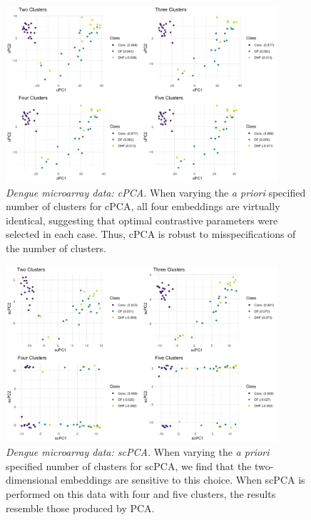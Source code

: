 \documentclass{article}
\begin{document}
\begin{figure}[!htbp]
    \centering
    \includegraphics[width=0.9\textwidth]{figures/dengue_cpca_centers}
    \caption{
    {\em Dengue microarray data: cPCA.}
    When varying the \textit{a priori} specified number of clusters for cPCA, all four embeddings are virtually identical, suggesting that optimal contrastive parameters were selected in each case. Thus, cPCA is robust to misspecifications of the number of clusters.}
    \label{fig:dengue_cpca_centers}
\end{figure}

\begin{figure}[!htbp]
    \centering
    \includegraphics[width=0.9\textwidth]{figures/dengue_scpca_centers}
    \caption{
    {\em Dengue microarray data: scPCA.}
    When varying the \textit{a priori} specified number of clusters for scPCA, we find that the two-dimensional embeddings are sensitive to this choice. When scPCA is performed on this data with four and five clusters, the results resemble those produced by PCA.}
    \label{fig:dengue_scpca_centers}
\end{figure}
\end{document}
